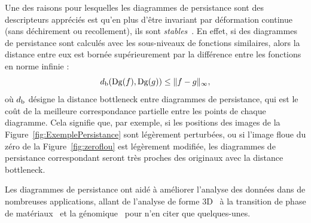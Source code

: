 
Une des raisons pour lesquelles les diagrammes de persistance sont des descripteurs appr\'eci\'es est qu'en plus d'\^etre invariant
par d\'eformation continue (sans d\'echirement ou recollement), ils sont {\em stables}~\cite{Chazal09a,Cohen07}. En effet, si des diagrammes de persistance sont 
calcul\'es avec les sous-niveaux de fonctions similaires, alors la distance entre eux est born\'ee sup\'erieurement par la diff\'erence
entre les fonctions en norme infinie :  
$$d_{\rm b}(\mathrm{Dg}(f),\mathrm{Dg}(g))\leq \|f-g\|_\infty,$$
o\`u $d_{\rm b}$ d\'esigne la distance bottleneck entre diagrammes de persistance, qui est le co\^ut de la meilleure correspondance  partielle
entre les points de chaque diagramme.
Cela signifie que, par exemple, si les positions des images de la Figure~\ref{fig:ExemplePersistance} sont l\'eg\`erement perturb\'ees,
ou si l'image floue du z\'ero de la Figure~\ref{fig:zeroflou} est l\'eg\`erement modifi\'ee, les diagrammes de persistance 
correspondant seront tr\`es proches des originaux avec la distance bottleneck.

Les diagrammes de persistance
ont aid\'e \`a am\'eliorer l'analyse des donn\'ees dans de nombreuses applications, allant de l'analyse de forme 3D~\cite{Carriere15a, Chazal09c} 
\`a la transition de phase de mat\'eriaux~\cite{Gameiro16, Hiraoka16} et la g\'enomique~\cite{Camara16,Chan13} pour n'en citer que quelques-unes. 



